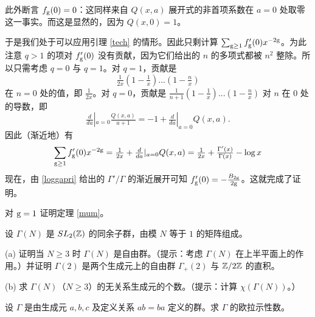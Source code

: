 此外断言 $f_{\rm g}(0)=0$：这同样来自 $Q(x,a)$ 展开式的非首项系数在 $a=0$ 处取零这一事实。而这是显然的，因为 $Q(x,0)=1$。

于是我们处于可以应用引理 \ref{tech} 的情形。因此只剩计算 $\sum_{{\rm g}\ge 1}f_{\rm g}'(0)x^{-2{\rm g}}$。为此注意 $q>1$ 的项对 $f_{\rm g}'(0)$ 没有贡献，因为它们给出的 $n$ 的多项式都被 $n^2$ 整除。所以只需考虑 $q=0$ 与 $q=1$。对 $q=1$，贡献是
$$
\tfrac{1}{2x}(1-\tfrac{1}{x})...(1-\tfrac{n}{x})
$$
在 $n=0$ 处的值，即 $\frac{1}{2x}$。对 $q=0$，贡献是 $\frac{1}{n+1}(1-\frac{1}{x})...(1-\frac{n}{x})$ 对 $n$ 在 $0$ 处的导数，即
$$
\tfrac{d}{da}|_{a=0}\tfrac{Q(x,a)}{a+1}=-1+\tfrac{d}{da}|_{a=0}Q(x,a).
$$
因此（渐近地）有
$$
\sum_{{\rm g}\ge 1}f_{\rm g}'(0)x^{-2{\rm g}}=\tfrac{1}{2x}+\tfrac{d}{da}|_{a=0}Q(x,a)=
\tfrac{1}{2x}+\tfrac{\Gamma'(x)}{\Gamma(x)}-\log x
$$
现在，由 \eqref{loggapri} 给出的 $\Gamma'/\Gamma$ 的渐近展开可知 $f_{\rm g}'(0)=-\frac{B_{2{\rm g}}}{2{\rm g}}$。这就完成了证明。


\begin{exercise} 对 ${\rm g}=1$ 证明定理 \ref{mum}。
\end{exercise}

\begin{exercise}
设 $\Gamma(N)$ 是 $SL_2(\Bbb Z)$ 的同余子群，由模 $N$ 等于 $1$ 的矩阵组成。

(a) 证明当 $N\ge 3$ 时 $\Gamma(N)$ 是自由群。（提示：考虑 $\Gamma(N)$ 在上半平面上的作用。）并证明 $\Gamma(2)$ 是两个生成元上的自由群 $\Gamma_+(2)$ 与 $\Bbb Z/2\Bbb Z$ 的直积。

(b) 求 $\Gamma(N)$（$N\ge 3$）的无关系生成元的个数。（提示：计算 $\chi(\Gamma(N))$。）
\end{exercise}

\begin{exercise} 设 $\Gamma$ 是由生成元 $a,b,c$ 及定义关系 $ab=ba$ 定义的群。求 $\Gamma$ 的欧拉示性数。
\end{exercise}

